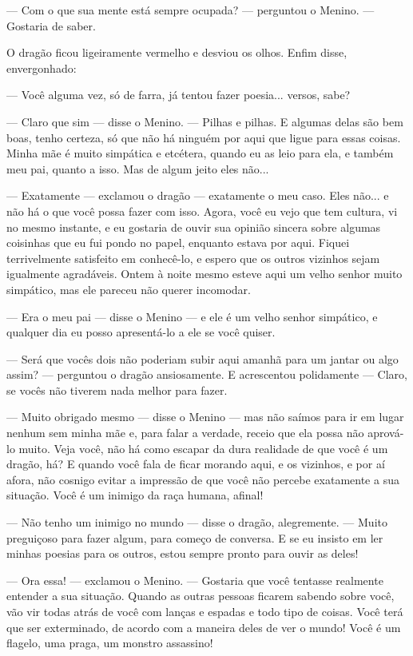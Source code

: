 — Com o que sua mente está sempre ocupada? — perguntou o Menino. —
Gostaria de saber. 

O dragão ficou ligeiramente vermelho e desviou os olhos. Enfim disse,
envergonhado:

— Você alguma vez, só de farra, já tentou fazer poesia... versos,
sabe?

— Claro que sim — disse o Menino. — Pilhas e pilhas. E algumas delas
são bem boas, tenho certeza, só que não há ninguém por aqui que ligue
para essas coisas. Minha mãe é muito simpática e etcétera, quando eu
as leio para ela, e também meu pai, quanto a isso. Mas de algum jeito
eles não...

— Exatamente — exclamou o dragão — exatamente o meu caso. Eles não...
e não há o que você possa fazer com isso. Agora, você eu vejo que tem
cultura, vi no mesmo instante, e eu gostaria de ouvir sua opinião
sincera sobre algumas coisinhas que eu fui pondo no papel, enquanto
estava por aqui. Fiquei terrivelmente satisfeito em conhecê-lo, e
espero que os outros vizinhos sejam igualmente agradáveis. Ontem à
noite mesmo esteve aqui um velho senhor muito simpático, mas ele
pareceu não querer incomodar.

— Era o meu pai — disse o Menino — e ele é um velho senhor simpático,
e qualquer dia eu posso apresentá-lo a ele se você quiser.

— Será que vocês dois não poderiam subir aqui amanhã para um jantar ou
algo assim? — perguntou o dragão ansiosamente. E acrescentou
polidamente — Claro, se vocês não tiverem nada melhor para fazer. 

— Muito obrigado mesmo — disse o Menino — mas não saímos para ir em
lugar nenhum sem minha mãe e, para falar a verdade, receio que ela
possa não aprová-lo muito. Veja você, não há como escapar da dura
realidade de que você é um dragão, há? E quando você fala de ficar
morando aqui, e os vizinhos, e por aí afora, não cosnigo evitar a
impressão de que você não percebe exatamente a sua situação. Você é
um inimigo da raça humana, afinal!

— Não tenho um inimigo no mundo — disse o dragão, alegremente. — Muito
preguiçoso para fazer algum, para começo de conversa. E se eu insisto
em ler minhas poesias para os outros, estou sempre pronto para ouvir
as deles!

— Ora essa! — exclamou o Menino. — Gostaria que você tentasse
realmente entender a sua situação. Quando as outras pessoas ficarem
sabendo sobre você, vão vir todas atrás de você com lanças e espadas
e todo tipo de coisas. Você terá que ser exterminado, de acordo com a
maneira deles de ver o mundo! Você é um flagelo, uma praga, um
monstro assassino!

